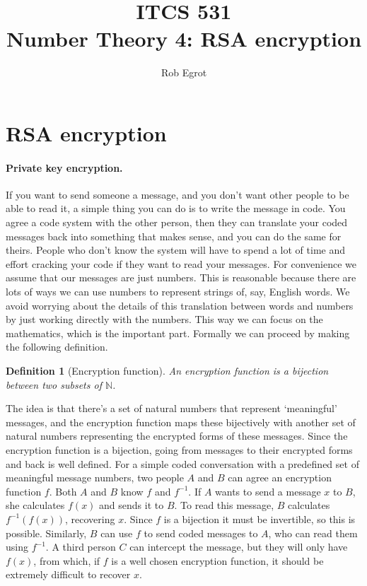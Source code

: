 \documentclass{article}
\title{ITCS 531 \\Number Theory 4: RSA encryption}
\author{Rob Egrot}
\date{}
\theoremstyle{plain}
\newtheorem{definition}[theorem]{Definition}{\bfseries}{\upshape}
\newcommand{\bN}{\mathbb{N}}
\begin{document}
\maketitle

\section{RSA encryption}

\paragraph{Private key encryption.}
If you want to send someone a message, and you don't want other people to be able to read it, a simple thing you can do is to write the message in code. You agree a code system with the other person, then they can translate your coded messages back into something that makes sense, and you can do the same for theirs. People who don't know the system will have to spend a lot of time and effort cracking your code if they want to read your messages. For convenience we assume that our messages are just numbers. This is reasonable because there are lots of ways we can use numbers to represent strings of, say, English words. We avoid worrying about the details of this translation between words and numbers by just working directly with the numbers. This way we can focus on the mathematics, which is the important part. Formally we can proceed by making the following definition. 

\begin{definition}[Encryption function]
An \emph{encryption function} is a bijection between two subsets of $\bN$.
\end{definition}
The idea is that there's a set of natural numbers that represent `meaningful' messages, and the encryption function maps these bijectively with another set of natural numbers representing the encrypted forms of these messages. Since the encryption function is a bijection, going from messages to their encrypted forms and back is well defined. For a simple coded conversation with a predefined set of meaningful message numbers, two people $A$ and $B$ can agree an encryption function $f$. Both $A$ and $B$ know $f$ and $f^{-1}$. If $A$ wants to send a message $x$ to $B$, she calculates $f(x)$ and sends it to $B$. To read this message, $B$ calculates $f^{-1}(f(x))$, recovering $x$. Since $f$ is a bijection it must be invertible, so this is possible. Similarly, $B$ can use $f$ to send coded messages to $A$, who can read them using $f^{-1}$. A third person $C$ can intercept the message, but they will only have $f(x)$, from which, if $f$ is a well chosen encryption function, it should be extremely difficult to recover $x$. 
\end{document}
